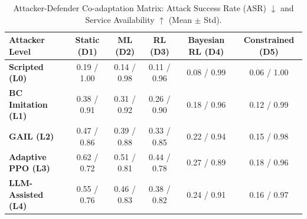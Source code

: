 \begin{table}[t]
\centering
\caption{Attacker-Defender Co-adaptation Matrix: Attack Success Rate (ASR) $\downarrow$ and Service Availability $\uparrow$ (Mean $\pm$ Std).}
\label{tab:adversary_matrix}
\begin{tabular}{lccccc}
\toprule
\textbf{Attacker Level} & \textbf{Static (D1)} & \textbf{ML (D2)} & \textbf{RL (D3)} & \textbf{Bayesian RL (D4)} & \textbf{Constrained (D5)} \\
\midrule
\textbf{Scripted (L0)} & 0.19 / 1.00 & 0.14 / 0.98 & 0.11 / 0.96 & 0.08 / 0.99 & 0.06 / 1.00 \\
\textbf{BC Imitation (L1)} & 0.38 / 0.91 & 0.31 / 0.92 & 0.26 / 0.90 & 0.18 / 0.96 & 0.12 / 0.99 \\
\textbf{GAIL (L2)} & 0.47 / 0.86 & 0.39 / 0.88 & 0.33 / 0.85 & 0.22 / 0.94 & 0.15 / 0.98 \\
\textbf{Adaptive PPO (L3)} & 0.62 / 0.72 & 0.51 / 0.81 & 0.44 / 0.78 & 0.27 / 0.89 & 0.18 / 0.96 \\
\textbf{LLM-Assisted (L4)} & 0.55 / 0.76 & 0.46 / 0.83 & 0.38 / 0.82 & 0.24 / 0.91 & 0.16 / 0.97 \\
\bottomrule
\end{tabular}
\end{table}